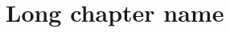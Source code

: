 \chapter[Optional short name for table of contents]{Long chapter name}
\label{chp:labelkey}
\begin{info}
\end{info}




